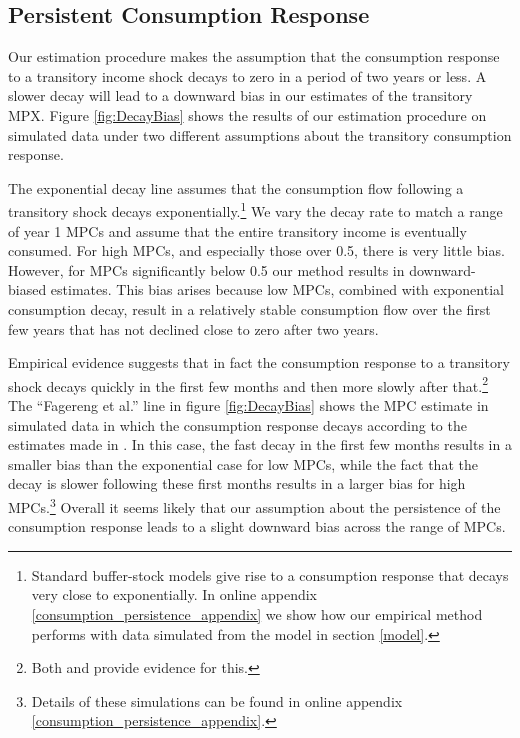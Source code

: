 \documentclass[titlepage]{\econtex}\newcommand{\texname}{ConsumptionHeterogeneity}
\begin{document}
\subsection{Persistent Consumption Response} \label{Consumption_persistence}
Our estimation procedure makes the assumption that the consumption response to a transitory income shock decays to zero in a period of two years or less. A slower decay will lead to a downward bias in our estimates of the transitory MPX. Figure \ref{fig:DecayBias} shows the results of our estimation procedure on simulated data under two different assumptions about the transitory consumption response.

The exponential decay line assumes that the consumption flow following a transitory shock decays exponentially.\footnote{Standard buffer-stock models give rise to a consumption response that decays very close to exponentially. In online appendix \ref{consumption_persistence_appendix} we show how our empirical method performs with data simulated from the model in section \ref{model}.} We vary the decay rate to match a range of year 1 MPCs and assume that the entire transitory income is eventually consumed. For high MPCs, and especially those over 0.5, there is very little bias. However, for MPCs significantly below 0.5 our method results in downward-biased estimates. This bias arises because low MPCs, combined with exponential consumption decay, result in a relatively stable consumption flow over the first few years that has not declined close to zero after two years.

Empirical evidence suggests that in fact the consumption response to a transitory shock decays quickly in the first few months and then more slowly after that.\footnote{Both \cite{fagereng_mpc_2016} and \cite{gelman_what_2016} provide evidence for this.} The ``Fagereng et al.'' line in figure \ref{fig:DecayBias} shows the MPC estimate in simulated data in which the consumption response decays according to the estimates made in \cite{fagereng_mpc_2016}. In this case, the fast decay in the first few months results in a smaller bias than the exponential case for low MPCs, while the fact that the decay is slower following these first months results in a larger bias for high MPCs.\footnote{Details of these simulations can be found in online appendix \ref{consumption_persistence_appendix}.} Overall it seems likely that our assumption about the persistence of the consumption response leads to a slight downward bias across the range of MPCs.
\end{document}
